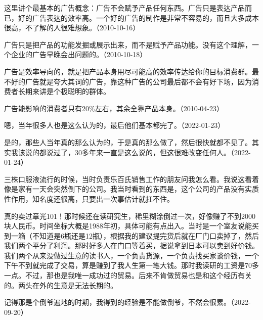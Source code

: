 这里讲个最基本的广告概念：广告不会赋予产品任何东西。广告只是表达产品而已，好的广告表达的效率高。一个好的广告的制作是非常不容易的，而且大多成本很高，不了解的人很难想象。（2010-10-16）

广告只是把产品的功能发掘或展示出来，而不是赋予产品功能。没有这个理解，一个企业的广告早晚会出问题的。（2010-10-18）

广告是效率导向的，就是把产品本身用尽可能高的效率传达给你的目标消费群。最不好的广告就是夸大其词的广告，靠这种广告的公司最后都不会有好下场，因为消费者长期来讲是个极聪明的群体。

广告能影响的消费者只有20\%左右，其余全靠产品本身。（2010-04-23）


嗯，当年很多人也是这么认为的，最后他们基本都完了。（2022-01-23）


是的，那些人当年真的那么认为的，于是真的那么做了，然后很快就都不见了。其实我该说的都说过了，30多年来一直是这么说的，但这很难改变任何人。（2022-01-24）


三株口服液流行的时候，当时负责乐百氏销售工作的朋友问我怎么看。我说这看着像是家有一天会突然倒下的公司。我当时看到的东西是，这个公司的产品没有实质性作用，知名度还很高，只要出一次事估计就扛不住。


真的卖过章光101！那时候还在读研究生，稀里糊涂倒过一次，好像赚了不到2000块人民币。时间坐标大概是1988年初，具体可能有点出入。当时是一个室友说能买到一箱（不知道是6瓶还是12瓶），根据我的建议提完货后就在厂门口卖掉了，然后我们两个平分了利润。那时好多人在门口等着买，据说拿到日本可以卖到好价钱。我们两个从来没做过生意的读书人，一个负责货源，一个负责找买家谈价钱，一个下午不到就完成了交易，算是赚到了我人生第一笔大钱。那时我读研的工资是70多一点。不过，那也是我唯一成功过的贸易。后来不肯做贸易也是和这个经历有关的。两头在外的生意是无法长期的。

记得那是个倒爷遍地的时期，我得到的经验是不能做倒爷，不然会很累。（2022-09-20）

